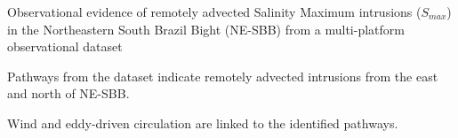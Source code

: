 \documentclass[draft]{agujournal2019}
\begin{document}







\begin{keypoints}
\item Observational evidence of remotely advected Salinity Maximum intrusions (\textit{$S_{max}$}) in the Northeastern South Brazil Bight (NE-SBB) from a multi-platform observational dataset
\item Pathways from the dataset indicate remotely advected intrusions from the east and north of NE-SBB.
\item Wind and eddy-driven circulation are linked to the identified pathways.
\end{keypoints}

%
%

%
%
\end{document}
